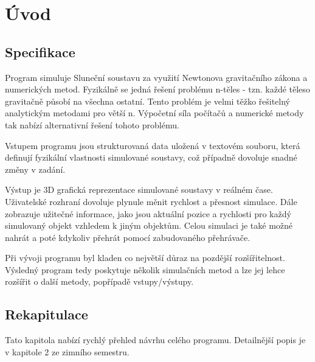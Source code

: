 
\chapter{Úvod}
\label{chap:uvod}

\setcounter{page}{1}
\section{Specifikace}
Program simuluje Sluneční soustavu za využití Newtonova gravitačního zákona a numerických metod. Fyzikálně se jedná řešení problému n-těles - tzn. každé těleso gravitačně působí na všechna ostatní. Tento problém je velmi těžko řešitelný analytickým metodami pro větší n. Výpočetní síla počítačů a numerické metody tak nabízí alternativní řešení tohoto problému.

Vstupem programu jsou strukturovaná data uložená v textovém souboru, která definují fyzikální vlastnosti simulované soustavy, což případně dovoluje snadné změny v zadání. 

Výstup je 3D grafická reprezentace simulované soustavy v reálném čase. Uživatelské rozhraní dovoluje plynule měnit rychlost a přesnost simulace. Dále zobrazuje užitečné informace, jako jsou aktuální pozice a rychlosti pro každý simulovaný objekt vzhledem k jiným objektům. Celou simulaci je také možné nahrát a poté kdykoliv přehrát pomocí zabudovaného přehrávače.

Při vývoji programu byl kladen co největší důraz na pozdější rozšířitelnost. Výsledný program tedy poskytuje několik simulačních metod a lze jej lehce rozšířit o další metody, popřípadě vstupy/výstupy.

\section{Rekapitulace}
\label{chap:rekapitulace}
Tato kapitola nabízí rychlý přehled návrhu celého programu. Detailnější popis je v kapitole 2 ze zimního semestru.


